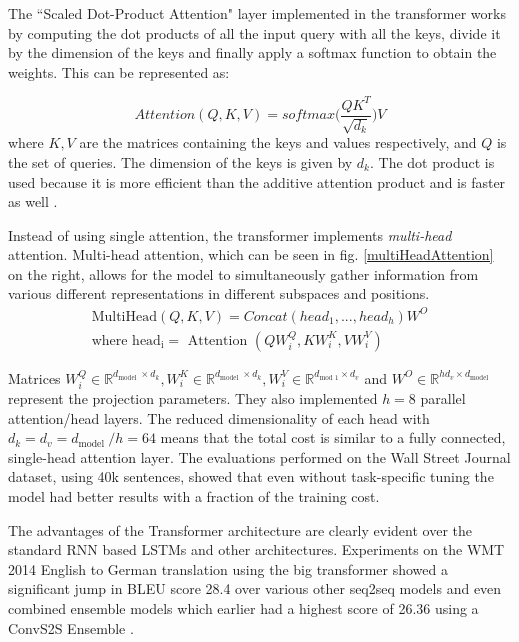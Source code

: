 \documentclass[a4paper,12pt]{report}
\begin{document}
            The ``Scaled Dot-Product Attention" layer implemented in the transformer works by computing the dot products of all the input query with all the keys, divide it by the dimension of the keys and finally apply a softmax function to obtain the weights. This can be represented as:

            \begin{equation}\label{attentionEq}
                Attention(Q,K,V)=softmax\bigg(\dfrac{QK^{T}}{\sqrt{d_k}}\bigg)V
            \end{equation}
            where $ K, V $ are the matrices containing the keys and values respectively, and $ Q $ is the set of queries. The dimension of the keys is given by $ d_k $. The dot product is used because it is more efficient than the additive attention product and is faster as well \citep{atayl}.

            Instead of using single attention, the transformer implements \textit{multi-head} attention.  Multi-head attention, which can be seen in fig. \ref{multiHeadAttention} on the right, allows for the model to simultaneously gather information from various different representations in different subspaces and positions.
            \begin{equation}\label{multiheadEQ}
            \begin{aligned}
               \text{MultiHead}(Q,K,V) = Concat(head_1,...,head_h)W^O \\
                \text{where head}_{\mathrm{i}}=\text { Attention }\left(Q W_{i}^{Q}, K W_{i}^{K}, V W_{i}^{V}\right)
            \end{aligned}
           \end{equation}

            Matrices $W_{i}^{Q} \in \mathbb{R}^{d_{\text {model }} \times d_{k}}, W_{i}^{K} \in \mathbb{R}^{d_{\text {model }} \times d_{k}}, W_{i}^{V} \in \mathbb{R}^{d_{\text {mod } 1} \times d_{v}}$ and $W^{O} \in \mathbb{R}^{h d_{v} \times d_{\text {model }}}$ represent the projection parameters. They also implemented $h=8$ parallel attention/head layers. The reduced dimensionality of each head with $d_{k}=d_{v}=d_{\text {model }} / h=64$ means that the total cost is similar to a fully connected, single-head attention layer.
            The evaluations performed on the Wall Street Journal dataset\citep{wsj}, using 40k sentences, showed that even without task-specific tuning the model had better results with a fraction of the training cost.

            The advantages of the Transformer architecture are clearly evident over the standard RNN based LSTMs and other architectures. Experiments on the WMT 2014 English to German translation \citep{wmt} using the big transformer showed a significant jump in BLEU score 28.4 over various other seq2seq models and even combined ensemble models which earlier had a highest score of 26.36 using a ConvS2S Ensemble \citep{convs2s}.
\end{document}
